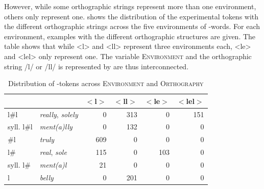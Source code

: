  However, while some orthographic strings represent more than one environment, others only represent one. 
 shows the distribution of the experimental tokens with the different orthographic strings across the five environments of -words. For each environment, examples with the different orthographic structures are given.
The table shows that while <l> and  <ll>  represent three environments each,  <le> and <lel> only represent one. 
The variable \textsc{Environment} and the orthographic string /l/ or /ll/ is represented by are thus interconnected. 


\begin{table} [h!]
	\caption{Distribution of -tokens across \textsc{Environment} and \textsc{Orthography}}
	\label{tab: ly dazta ortho and environment}
	
	
		\begin{tabular}{llrrrr}
				\lsptoprule
			&      & $<$l$>$  & $<$ll$>$ & $<$le$>$ & $<$lel$>$ \\
			
			\midrule
			
			
			
			l\#l  &\color[HTML]{3166FF}\textit{really}, \color[HTML]{3166FF}\textit{solely}   
			&       0 &     313  &   0&    151\\
			
			syll. l\#l &\color[HTML]{3166FF}\textit{ment(a)lly}   &   0 &     132    &   0 &   0\\
			
			\#l   &\color[HTML]{3166FF}\textit{truly} &        609   &   0    &   0  &    0\\
			
			l\#   &\color[HTML]{3166FF}\textit{real}, \color[HTML]{3166FF}\textit{sole} &        115&   0  &         103& 0\\
			
			syll. l\#&\color[HTML]{3166FF}\textit{ment(a)l} &         21&   0  &    0 &     0\\
			
			l        &\color[HTML]{3166FF}\textit{belly}  &    0 &    201    &   0 &   0\\
			\midrule
			
		\end{tabular}
	
\end{table}

